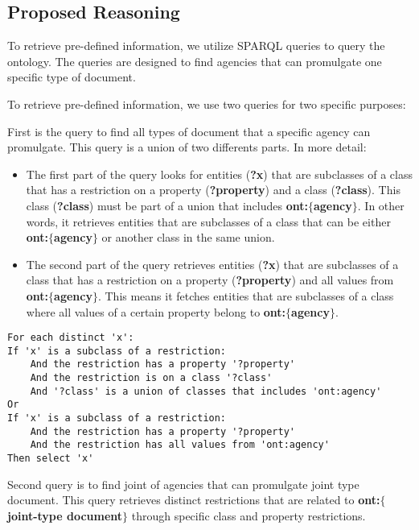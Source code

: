 \subsection{Proposed Reasoning}

To retrieve pre-defined information, we utilize SPARQL queries to query the ontology. The queries are designed to find agencies that can promulgate one specific type of document.




To retrieve pre-defined information, we use two queries for two specific purposes:

First is the query to find all types of document that a specific agency can promulgate. This query is a union of two differents parts. In more detail:
\begin{itemize}
    \item The first part of the query looks for entities (\textbf{?x}) that are subclasses of a class that has a restriction on a property (\textbf{?property}) and a class (\textbf{?class}). This class (\textbf{?class}) must be part of a union that includes \textbf{ont:$\{$agency$\}$}. In other words, it retrieves entities that are subclasses of a class that can be either \textbf{ont:$\{$agency$\}$} or another class in the same union.
    \item The second part of the query retrieves entities (\textbf{?x}) that are subclasses of a class that has a restriction on a property (\textbf{?property}) and all values from \textbf{ont:$\{$agency$\}$}. This means it fetches entities that are subclasses of a class where all values of a certain property belong to \textbf{ont:$\{$agency$\}$}.
\end{itemize}





\begin{lstlisting}
For each distinct 'x':
If 'x' is a subclass of a restriction:
    And the restriction has a property '?property'
    And the restriction is on a class '?class'
    And '?class' is a union of classes that includes 'ont:agency'
Or
If 'x' is a subclass of a restriction:
    And the restriction has a property '?property'
    And the restriction has all values from 'ont:agency'
Then select 'x' 
\end{lstlisting}


Second query is to find joint of agencies that can promulgate joint type document. This query retrieves distinct restrictions that are related to \textbf{ont:$\{$joint-type document$\}$} through specific class and property restrictions.

